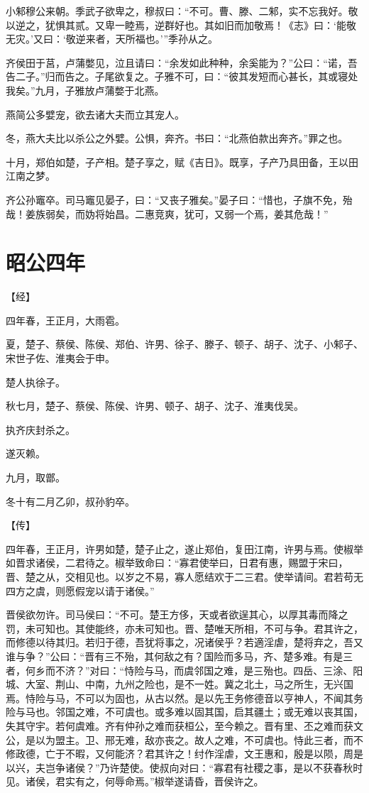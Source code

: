 \documentclass[a4paper,12pt,UTF8,twoside]{ctexbook}
\begin{document}
小邾穆公来朝。季武子欲卑之，穆叔曰：“不可。曹、滕、二邾，实不忘我好。敬以逆之，犹惧其贰。又卑一睦焉，逆群好也。其如旧而加敬焉！《志》曰：‘能敬无灾。’又曰：‘敬逆来者，天所福也。’”季孙从之。

齐侯田于莒，卢蒲嫳见，泣且请曰：“余发如此种种，余奚能为？”公曰：“诺，吾告二子。”归而告之。子尾欲复之。子雅不可，曰：“彼其发短而心甚长，其或寝处我矣。”九月，子雅放卢蒲嫳于北燕。

燕简公多嬖宠，欲去诸大夫而立其宠人。

冬，燕大夫比以杀公之外嬖。公惧，奔齐。书曰：“北燕伯款出奔齐。”罪之也。

十月，郑伯如楚，子产相。楚子享之，赋《吉日》。既享，子产乃具田备，王以田江南之梦。

齐公孙竈卒。司马竈见晏子，曰：“又丧子雅矣。”晏子曰：“惜也，子旗不免，殆哉！姜族弱矣，而妫将始昌。二惠竞爽，犹可，又弱一个焉，姜其危哉！”


\chapter{昭公四年}



【经】

四年春，王正月，大雨雹。

夏，楚子、蔡侯、陈侯、郑伯、许男、徐子、滕子、顿子、胡子、沈子、小邾子、宋世子佐、淮夷会于申。

楚人执徐子。

秋七月，楚子、蔡侯、陈侯、许男、顿子、胡子、沈子、淮夷伐吴。

执齐庆封杀之。

遂灭赖。

九月，取鄫。

冬十有二月乙卯，叔孙豹卒。

【传】

四年春，王正月，许男如楚，楚子止之，遂止郑伯，复田江南，许男与焉。使椒举如晋求诸侯，二君待之。椒举致命曰：“寡君使举曰，日君有惠，赐盟于宋曰，晋、楚之从，交相见也。以岁之不易，寡人愿结欢于二三君。使举请间。君若苟无四方之虞，则愿假宠以请于诸侯。”

晋侯欲勿许。司马侯曰：“不可。楚王方侈，天或者欲逞其心，以厚其毒而降之罚，未可知也。其使能终，亦未可知也。晋、楚唯天所相，不可与争。君其许之，而修德以待其归。若归于德，吾犹将事之，况诸侯乎？若適淫虐，楚将弃之，吾又谁与争？”公曰：“晋有三不殆，其何敌之有？国险而多马，齐、楚多难。有是三者，何乡而不济？”对曰：“恃险与马，而虞邻国之难，是三殆也。四岳、三涂、阳城、大室、荆山、中南，九州之险也，是不一姓。冀之北土，马之所生，无兴国焉。恃险与马，不可以为固也，从古以然。是以先王务修德音以亨神人，不闻其务险与马也。邻国之难，不可虞也。或多难以固其国，启其疆土；或无难以丧其国，失其守宇。若何虞难。齐有仲孙之难而获桓公，至今赖之。晋有里、丕之难而获文公，是以为盟主。卫、邢无难，敌亦丧之。故人之难，不可虞也。恃此三者，而不修政德，亡于不暇，又何能济？君其许之！纣作淫虐，文王惠和，殷是以陨，周是以兴，夫岂争诸侯？”乃许楚使。使叔向对曰：“寡君有社稷之事，是以不获春秋时见。诸侯，君实有之，何辱命焉。”椒举遂请昏，晋侯许之。
\end{document}
